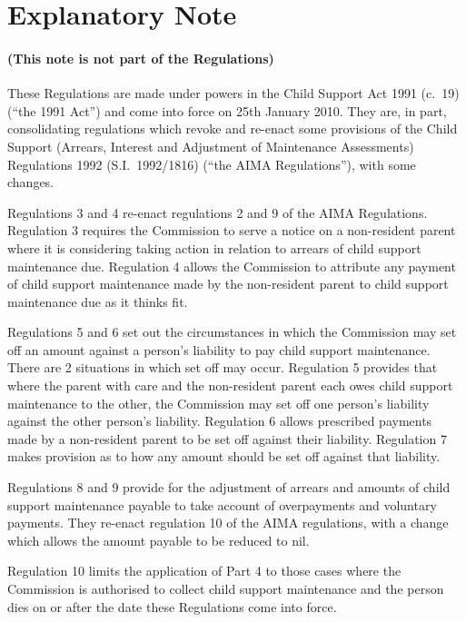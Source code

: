 \documentclass[12pt,a4paper]{article}
\begin{document}
\clearpage

\part{Explanatory Note}

\renewcommand\parthead{— Explanatory Note}

\subsection*{(This note is not part of the Regulations)}

These Regulations are made under powers in the Child Support Act 1991 (c.~19) (“the 1991 Act”) and come into force on 25th January 2010. They are, in part, consolidating regulations which revoke and re-enact some provisions of the Child Support (Arrears, Interest and Adjustment of Maintenance Assessments) Regulations 1992 (S.I.~1992/1816) (“the AIMA Regulations”), with some changes.

Regulations 3 and 4 re-enact regulations 2 and 9 of the AIMA Regulations. Regulation 3 requires the Commission to serve a notice on a non-resident parent where it is considering taking action in relation to arrears of child support maintenance due. Regulation 4 allows the Commission to attribute any payment of child support maintenance made by the non-resident parent to child support maintenance due as it thinks fit.

Regulations 5 and 6 set out the circumstances in which the Commission may set off an amount against a person’s liability to pay child support maintenance. There are 2 situations in which set off may occur. Regulation 5 provides that where the parent with care and the non-resident parent each owes child support maintenance to the other, the Commission may set off one person’s liability against the other person’s liability. Regulation 6 allows prescribed payments made by a non-resident parent to be set off against their liability. Regulation 7 makes provision as to how any amount should be set off against that liability.

Regulations 8 and 9 provide for the adjustment of arrears and amounts of child support maintenance payable to take account of overpayments and voluntary payments. They re-enact regulation 10 of the AIMA regulations, with a change which allows the amount payable to be reduced to nil.

Regulation 10 limits the application of Part 4 to those cases where the Commission is authorised to collect child support maintenance and the person dies on or after the date these Regulations come into force.
\end{document}
